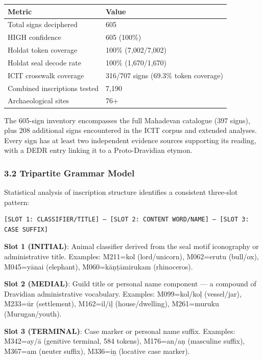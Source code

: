 \documentclass[
  11pt,
]{article}
\newcounter{none} %
\begin{document}
{\def\LTcaptype{none} %
\begin{longtable}[]{@{}ll@{}}
\toprule\noalign{}
Metric & Value \\
\midrule\noalign{}
\endhead
\bottomrule\noalign{}
\endlastfoot
Total signs deciphered & 605 \\
HIGH confidence & 605 (100\%) \\
Holdat token coverage & 100\% (7,002/7,002) \\
Holdat seal decode rate & 100\% (1,670/1,670) \\
ICIT crosswalk coverage & 316/707 signs (69.3\% token coverage) \\
Combined inscriptions tested & 7,190 \\
Archaeological sites & 76+ \\
\end{longtable}
}

The 605-sign inventory encompasses the full Mahadevan catalogue (397
signs), plus 208 additional signs encountered in the ICIT corpus
and extended analyses. Every sign has at least two independent evidence
sources supporting its reading, with a DEDR entry linking it to a
Proto-Dravidian etymon.

\subsubsection{3.2 Tripartite Grammar
Model}\label{tripartite-grammar-model}

Statistical analysis of inscription structure identifies a consistent
three-slot pattern:

\begin{verbatim}
[SLOT 1: CLASSIFIER/TITLE] – [SLOT 2: CONTENT WORD/NAME] – [SLOT 3: CASE SUFFIX]
\end{verbatim}

\textbf{Slot 1 (INITIAL)}: Animal classifier derived from the seal motif
iconography or administrative title. Examples: M211=kol (lord/unicorn),
M062=erutu (bull/ox), M045=yānai (elephant), M060=kāṇṭāmirukam
(rhinoceros).

\textbf{Slot 2 (MEDIAL)}: Guild title or personal name component --- a
compound of Dravidian administrative vocabulary. Examples: M099=kol/koḷ
(vessel/jar), M233=ūr (settlement), M162=il/iḷ (house/dwelling),
M261=muruku (Murugan/youth).

\textbf{Slot 3 (TERMINAL)}: Case marker or personal name suffix.
Examples: M342=ay/ā (genitive terminal, 584 tokens), M176=an/aṇ
(masculine suffix), M367=am (neuter suffix), M336=iṉ (locative case
marker).
\end{document}
